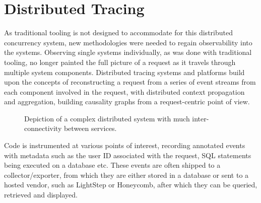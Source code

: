 \documentclass[12pt,pdftex,titlepage]{report}
\begin{document}
        \section{Distributed Tracing}
            As traditional tooling is not designed to accommodate for this distributed concurrency system, new methodologies were needed to regain observability into the systems.
            Observing single systems individually, as was done with traditional tooling, no longer painted the full picture of a request as it travels through multiple system 
            components. Distributed tracing systems and platforms build upon the concepts of reconstructing a request from a series of event streams from each component involved
            in the request, with distributed context propagation and aggregation, building causality graphs from a request-centric point of view.

            \begin{figure}[hbt!]
                \centering
                \caption{Depiction of a complex distributed system with much inter-connectivity between services.}
                \label{fig:dist}
            \end{figure}

            Code is instrumented at various points of interest, recording annotated events with metadata such as the user ID associated with the request, SQL statements being 
            executed on a database etc. These events are often shipped to a collector/exporter, from which they are either stored in a database or sent to a hosted vendor, such as
            LightStep or Honeycomb, after which they can be queried, retrieved and displayed.
\end{document}
